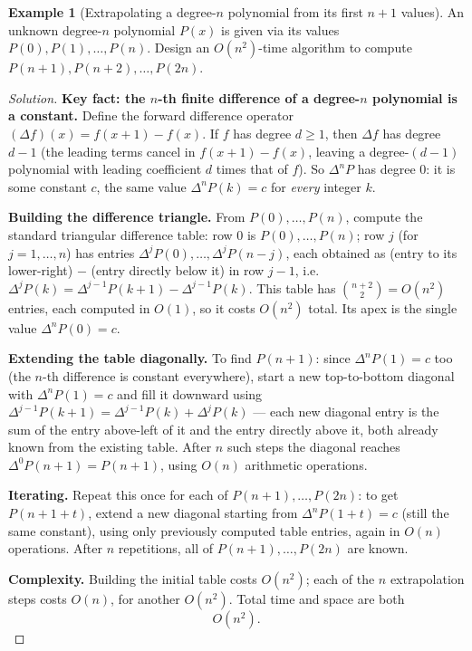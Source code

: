 \documentclass[11pt]{article}
\theoremstyle{definition}
\newtheorem{example}{Example}[section]
\begin{document}
\begin{example}[Extrapolating a degree-$n$ polynomial from its first $n+1$ values]
An unknown degree-$n$ polynomial $P(x)$ is given via its values $P(0),P(1),\dots,P(n)$. Design an $O(n^2)$-time algorithm to compute $P(n+1),P(n+2),\dots,P(2n)$.
\end{example}
\begin{proof}[Solution]
\textbf{Key fact: the $n$-th finite difference of a degree-$n$ polynomial is a constant.} Define the forward difference operator $(\Delta f)(x)=f(x+1)-f(x)$. If $f$ has degree $d\ge1$, then $\Delta f$ has degree $d-1$ (the leading terms cancel in $f(x+1)-f(x)$, leaving a degree-$(d-1)$ polynomial with leading coefficient $d$ times that of $f$). So $\Delta^n P$ has degree $0$: it is some constant $c$, the same value $\Delta^n P(k)=c$ for \emph{every} integer $k$.

\textbf{Building the difference triangle.} From $P(0),\dots,P(n)$, compute the standard triangular difference table: row $0$ is $P(0),\dots,P(n)$; row $j$ (for $j=1,\dots,n$) has entries $\Delta^j P(0),\dots,\Delta^j P(n-j)$, each obtained as (entry to its lower-right) $-$ (entry directly below it) in row $j-1$, i.e.\ $\Delta^jP(k)=\Delta^{j-1}P(k+1)-\Delta^{j-1}P(k)$. This table has $\binom{n+2}{2}=O(n^2)$ entries, each computed in $O(1)$, so it costs $O(n^2)$ total. Its apex is the single value $\Delta^nP(0)=c$.

\textbf{Extending the table diagonally.} To find $P(n+1)$: since $\Delta^nP(1)=c$ too (the $n$-th difference is constant everywhere), start a new top-to-bottom diagonal with $\Delta^nP(1)=c$ and fill it downward using $\Delta^{j-1}P(k+1)=\Delta^{j-1}P(k)+\Delta^jP(k)$ — each new diagonal entry is the sum of the entry above-left of it and the entry directly above it, both already known from the existing table. After $n$ such steps the diagonal reaches $\Delta^0P(n+1)=P(n+1)$, using $O(n)$ arithmetic operations.

\textbf{Iterating.} Repeat this once for each of $P(n+1),\dots,P(2n)$: to get $P(n+1+t)$, extend a new diagonal starting from $\Delta^nP(1+t)=c$ (still the same constant), using only previously computed table entries, again in $O(n)$ operations. After $n$ repetitions, all of $P(n+1),\dots,P(2n)$ are known.

\textbf{Complexity.} Building the initial table costs $O(n^2)$; each of the $n$ extrapolation steps costs $O(n)$, for another $O(n^2)$. Total time and space are both
\[
\boxed{O(n^2)}.
\]
\end{proof}
\end{document}
